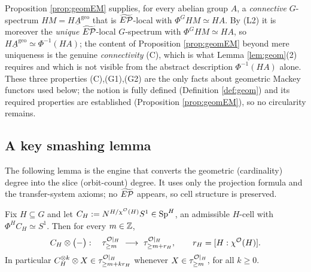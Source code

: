 \begin{qfiveremark}\label{rem:geom-source}
Proposition \ref{prop:geomEM} supplies, for every abelian group $A$, a
\emph{connective} $G$-spectrum $HM=H\underline A^{\mathrm{geo}}$ that is
$\widetilde{E\mathcal P}$-local with $\Phi^G HM\simeq HA$. By (L2) it is moreover the
\emph{unique} $\widetilde{E\mathcal P}$-local $G$-spectrum with $\Phi^G HM\simeq HA$, so
$H\underline A^{\mathrm{geo}}\simeq\Phi^{-1}(HA)$; the content of Proposition
\ref{prop:geomEM} beyond mere uniqueness is the genuine \emph{connectivity}
(C), which is what Lemma \ref{lem:geom}(2) requires and which is not visible from
the abstract description $\Phi^{-1}(HA)$ alone. These three properties
(C),(G1),(G2) are the only facts about geometric Mackey functors used below; the
notion is fully defined (Definition \ref{def:geom}) and its required properties
are established (Proposition \ref{prop:geomEM}), so no circularity remains.
\end{qfiveremark}


\subsection*{A key smashing lemma}

The following lemma is the engine that converts the geometric (cardinality)
degree into the slice (orbit-count) degree. It uses only the projection formula
and the transfer-system axioms; no $\widetilde{E\mathcal P}$ appears, so cell structure is
preserved.

\begin{qfivelemma}\label{lem:shift}
Fix $H\subseteq G$ and let $C_H:=N^{H/\chi^{\mathcal{O}}(H)}S^1\in\mathrm{Sp}^H$, an admissible
$H$-cell with $\Phi^H C_H\simeq S^1$. Then for every $m\in\mathbb{Z}$,
\[
C_H\otimes\bigl(-\bigr):\quad \tau^{\mathcal{O}|_H}_{\ge m}\ \longrightarrow\
\tau^{\mathcal{O}|_H}_{\ge m+r_H},\qquad r_H=[H:\chi^{\mathcal{O}}(H)].
\]
In particular $C_H^{\otimes k}\otimes X\in\tau^{\mathcal{O}|_H}_{\ge m+kr_H}$ whenever
$X\in\tau^{\mathcal{O}|_H}_{\ge m}$, for all $k\ge 0$.
\end{qfivelemma}

